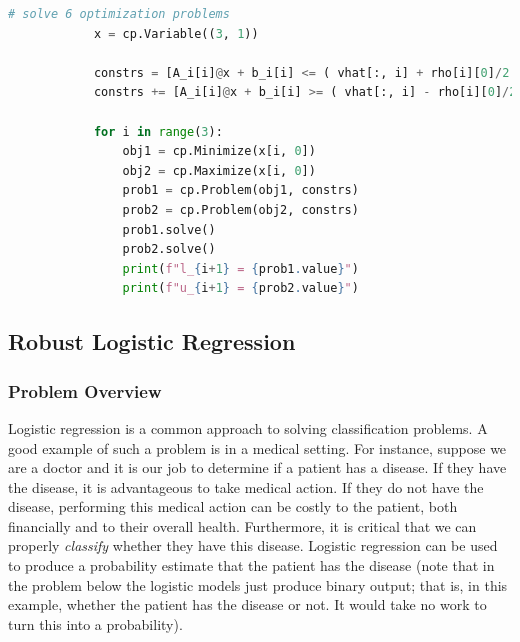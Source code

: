 \documentclass[12pt,reqno]{article}
\theoremstyle{definition}
\numberwithin{equation}{section}
\begin{document}
        \begin{algorithm}[htbp]
            \caption{Bounding Box Solution}
            \centering
                \begin{lstlisting}[language=Python]
                    # solve 6 optimization problems
            x = cp.Variable((3, 1))

            constrs = [A_i[i]@x + b_i[i] <= ( vhat[:, i] + rho[i][0]/2 ).reshape((2, 1)) * (cT_i[i]@x + d_i[i] ) for i in range(m)]
            constrs += [A_i[i]@x + b_i[i] >= ( vhat[:, i] - rho[i][0]/2 ).reshape((2, 1)) * (cT_i[i]@x + d_i[i] ) for i in range(m)]

            for i in range(3):
                obj1 = cp.Minimize(x[i, 0])
                obj2 = cp.Maximize(x[i, 0])
                prob1 = cp.Problem(obj1, constrs)
                prob2 = cp.Problem(obj2, constrs)
                prob1.solve()
                prob2.solve()
                print(f"l_{i+1} = {prob1.value}")
                print(f"u_{i+1} = {prob2.value}")
                \end{lstlisting}
                \label{alg:bounding-box-solve}
            \end{algorithm}



\newpage
\subsection{Robust Logistic Regression}

\subsubsection*{Problem Overview}
Logistic regression is a common approach to solving classification problems. A good example of such a problem is
in a medical setting. For instance, suppose we are a doctor and it is our job to determine if a patient has a disease.
If they have the disease, it is advantageous to take medical action. If they do not have the disease, performing this
medical action can be costly to the patient, both financially and to their overall health. Furthermore, it is critical
that we can properly \textit{classify} whether they have this disease. Logistic regression can be used to produce
a probability estimate that the patient has the disease (note that in the problem below the logistic models just produce binary output; that
is, in this example, whether the patient has the disease or not. It would take no work to turn this into a probability).
\end{document}
